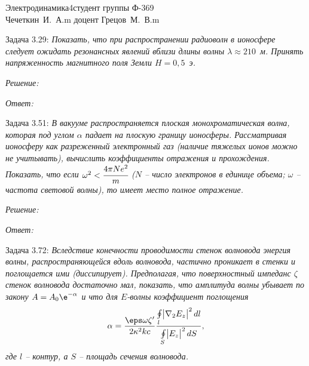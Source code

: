 





\newcommand{\ds}{\displaystyle}


{Электродинамика}{4}{}{студент группы Ф-369\\Чечеткин~И.~А.}{m}
{доцент Грецов~М.~В.}{m}

\newpage
Задача 3.29: \emph{Показать, что при распространении радиоволн в ионосфере
следует ожидать  резонансных явлений вблизи длины волны
\( \lambda \approx 210 \)~м. Принять напряженность магнитного поля Земли
\( H = 0,5 \)~э.}

\vspace*{2em}
\emph{Решение:}

\vspace*{2em}   
\emph{Ответ:}

\newpage
Задача 3.51: \emph{В вакууме распространяется плоская монохроматическая волна,
которая под углом \( \alpha \) падает на плоскую границу ионосферы.
Рассматривая ионосферу как разреженный электронный газ (наличие тяжелых ионов
можно не учитывать), вычислить коэффициенты отражения и прохождения. Показать,
что если \( \omega^2 < \cfrac{4\pi Ne^2}{m} \) (\( N \) -- число электронов в
единице объема; \( \omega \) -- частота световой волны), то имеет место полное
отражение.}

\vspace*{2em}
\emph{Решение:}

\vspace*{2em}   
\emph{Ответ:}

\pagebreak
Задача 3.72: \emph{Вследствие конечности проводимости стенок волновода энергия
волны, распространяющейся вдоль волновода, частично проникает в стенки и
поглощается ими (диссипирует). Предполагая, что поверхностный импеданс
\( \zeta \) стенок волновода достаточно мал, показать, что амплитуда волны
убывает по закону \( A = A_0\e^{-\alpha} \) и что для \( E \)-волны коэффициент
поглощения
\[
    \alpha = \frac{\eps\omega\zeta'}{2\kappa^2 kc} \frac{\oint\limits_l
    \bigr|\nabla_2 E_z\bigl|^2\,dl}{\oint\limits_S \bigr|E_z\bigl|^2\,dS},
\]
где \( l \) -- контур, а \( S \) -- площадь сечения волновода.}

